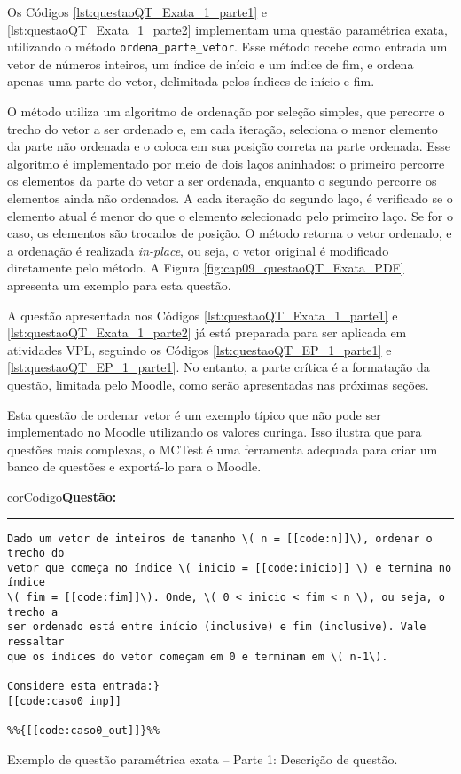 Os Códigos \ref{lst:questaoQT_Exata_1_parte1} e \ref{lst:questaoQT_Exata_1_parte2} implementam uma questão paramétrica exata, utilizando o método \verb|ordena_parte_vetor|. Esse método recebe como entrada um vetor de números inteiros, um índice de início e um índice de fim, e ordena apenas uma parte do vetor, delimitada pelos índices de início e fim.

O método utiliza um algoritmo de ordenação por seleção simples, que percorre o trecho do vetor a ser ordenado e, em cada iteração, seleciona o menor elemento da parte não ordenada e o coloca em sua posição correta na parte ordenada. Esse algoritmo é implementado por meio de dois laços aninhados: o primeiro percorre os elementos da parte do vetor a ser ordenada, enquanto o segundo percorre os elementos ainda não ordenados. A cada iteração do segundo laço, é verificado se o elemento atual é menor do que o elemento selecionado pelo primeiro laço. Se for o caso, os elementos são trocados de posição.
%
O método retorna o vetor ordenado, e a ordenação é realizada \textit{in-place}, ou seja, o vetor original é modificado diretamente pelo método. A Figura \ref{fig:cap09_questaoQT_Exata_PDF} apresenta um exemplo para esta questão.

A questão apresentada nos Códigos \ref{lst:questaoQT_Exata_1_parte1} e \ref{lst:questaoQT_Exata_1_parte2} já está preparada para ser aplicada em atividades VPL, seguindo os Códigos \ref{lst:questaoQT_EP_1_parte1} e \ref{lst:questaoQT_EP_1_parte1}. No entanto, a parte crítica é a formatação da questão, limitada pelo Moodle, como serão apresentadas nas próximas seções.

Esta questão de ordenar vetor é um exemplo típico que não pode ser implementado no Moodle utilizando os valores curinga. Isso ilustra que para questões mais complexas, o MCTest é uma ferramenta adequada para criar um banco de questões e exportá-lo para o Moodle.


\begin{listing}[!ht]
\begin{myboxCode}{corCodigo}{\textbf{Questão: }}\vspace{3mm}
\hrule
\begin{verbatim}
Dado um vetor de inteiros de tamanho \( n = [[code:n]]\), ordenar o trecho do 
vetor que começa no índice \( inicio = [[code:inicio]] \) e termina no índice 
\( fim = [[code:fim]]\). Onde, \( 0 < inicio < fim < n \), ou seja, o trecho a 
ser ordenado está entre início (inclusive) e fim (inclusive). Vale ressaltar 
que os índices do vetor começam em 0 e terminam em \( n-1\). 

Considere esta entrada:} 
[[code:caso0_inp]]

%%{[[code:caso0_out]]}%%
\end{verbatim}
\end{myboxCode}
\caption{Exemplo de questão paramétrica exata -- Parte 1: Descrição de questão.}
\label{lst:questaoQT_Exata_1_parte1}
\end{listing}

